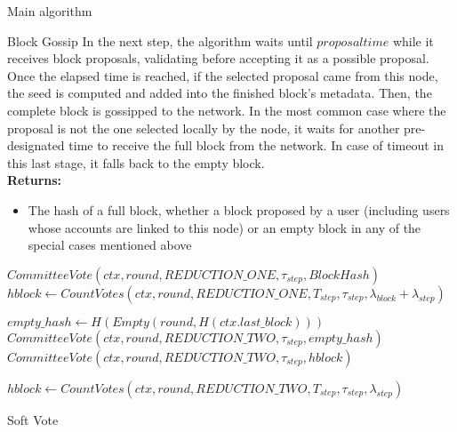 \documentclass[10pt,a4paper]{article}
\begin{document}
\begin{section}{Main algorithm}
\begin{subsection}{Block Gossip}
In the next step, the algorithm waits until $proposal time$ while it receives 
block proposals, 
validating before accepting it as a possible proposal.
Once the elapsed time is reached, if the selected proposal came from this node, 
the seed is computed and added into the finished block's metadata. 
Then, the complete block is gossipped to the network.
In the most common case where the proposal is not the one selected 
locally by the node, it waits for another pre-designated time to 
receive the full block from the network.
In case of timeout in this last stage, it falls back to the empty block.\\

\noindent \textbf{Returns:}
\begin{itemize}
    \item The hash of a full block, whether a block proposed by a user (including users whose accounts are 
    linked to this node) or an empty block in any of the special cases mentioned above
  \end{itemize}

\begin{algorithm}[H]
    \begin{algorithmic}[H]
    
    \State $CommitteeVote(ctx, round, REDUCTION\_ONE, \tau_{step}, BlockHash)$
    \State $hblock \gets CountVotes(ctx, round, REDUCTION\_ONE, T_{step}, \tau_{step}, \lambda_{block} + \lambda_{step})$

    \State $empty\_hash \gets H(Empty(round, H(ctx.last\_block)))$ 
        \State $CommitteeVote(ctx, round, REDUCTION\_TWO, \tau_{step}, empty\_hash)$
    \Else
        {\State $CommitteeVote(ctx, round, REDUCTION\_TWO, \tau_{step}, hblock)$}
    \EndIf\

    \State $hblock \gets CountVotes(ctx, round, REDUCTION\_TWO, T_{step}, \tau_{step}, \lambda_{step})$ 


    \EndFunction
    \end{algorithmic}
    \caption{\underline{Soft Vote}}
\end{algorithm}


\end{subsection}
\begin{subsection}{Soft Vote}


\end{subsection}
\end{section}
\end{document}
